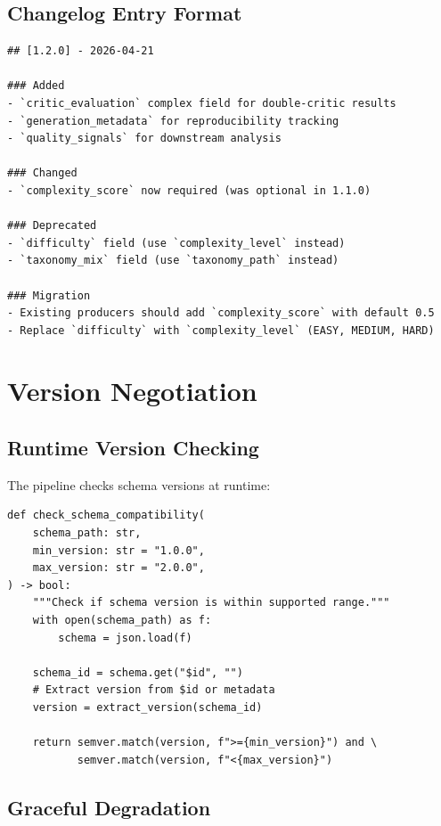 \subsection{Changelog Entry Format}

\begin{lstlisting}[basicstyle=\ttfamily\small,caption={Changelog entry format.}]
## [1.2.0] - 2026-04-21

### Added
- `critic_evaluation` complex field for double-critic results
- `generation_metadata` for reproducibility tracking
- `quality_signals` for downstream analysis

### Changed
- `complexity_score` now required (was optional in 1.1.0)

### Deprecated
- `difficulty` field (use `complexity_level` instead)
- `taxonomy_mix` field (use `taxonomy_path` instead)

### Migration
- Existing producers should add `complexity_score` with default 0.5
- Replace `difficulty` with `complexity_level` (EASY, MEDIUM, HARD)
\end{lstlisting}

\section{Version Negotiation}

\subsection{Runtime Version Checking}

The pipeline checks schema versions at runtime:

\begin{lstlisting}[language=jsonx,caption={Version negotiation.}]
def check_schema_compatibility(
    schema_path: str,
    min_version: str = "1.0.0",
    max_version: str = "2.0.0",
) -> bool:
    """Check if schema version is within supported range."""
    with open(schema_path) as f:
        schema = json.load(f)
    
    schema_id = schema.get("$id", "")
    # Extract version from $id or metadata
    version = extract_version(schema_id)
    
    return semver.match(version, f">={min_version}") and \
           semver.match(version, f"<{max_version}")
\end{lstlisting}

\subsection{Graceful Degradation}

